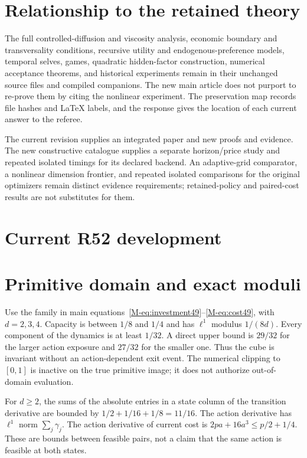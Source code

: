 \documentclass[ecta,nameyear,draft]{econsocart}
\begin{document}
\section{Relationship to the retained theory}
The full controlled-diffusion and viscosity analysis, economic boundary and transversality conditions, recursive utility and endogenous-preference models, temporal selves, games, quadratic hidden-factor construction, numerical acceptance theorems, and historical experiments remain in their unchanged source files and compiled companions. The new main article does not purport to re-prove them by citing the nonlinear experiment. The preservation map records file hashes and LaTeX labels, and the response gives the location of each current answer to the referee.

The current revision supplies an integrated paper and new proofs and evidence. The new constructive catalogue supplies a separate horizon/price study and repeated isolated timings for its declared backend. An adaptive-grid comparator, a nonlinear dimension frontier, and repeated isolated comparisons for the original optimizers remain distinct evidence requirements; retained-policy and paired-cost results are not substitutes for them.








\clearpage
\section*{Current R52 development}
\section{Primitive domain and exact moduli}\label{supp:primitive49}
Use the family in main equations~\eqref{M-eq:investment49}--\eqref{M-eq:cost49}, with $d=2,3,4$. Capacity is between $1/8$ and $1/4$ and has $\ell^1$ modulus $1/(8d)$. Every component of the dynamics is at least $1/32$. A direct upper bound is $29/32$ for the larger action exposure and $27/32$ for the smaller one. Thus the cube is invariant without an action-dependent exit event. The numerical clipping to $[0,1]$ is inactive on the true primitive image; it does not authorize out-of-domain evaluation.

For $d\ge2$, the sums of the absolute entries in a state column of the transition derivative are bounded by $1/2+1/16+1/8=11/16$. The action derivative has $\ell^1$ norm $\sum_j\gamma_j$. The action derivative of current cost is $2pa+16a^3\le p/2+1/4$. These are bounds between feasible pairs, not a claim that the same action is feasible at both states.
\end{document}
